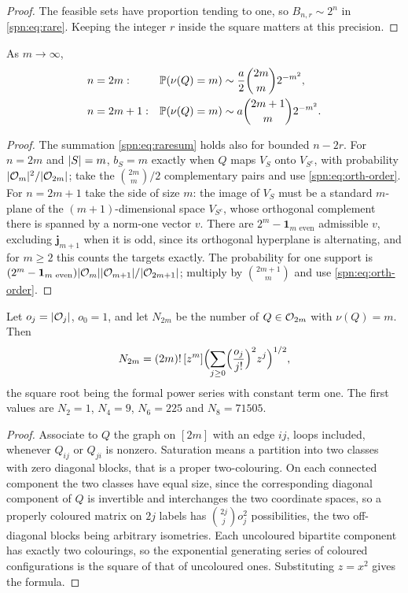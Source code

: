 \begin{proof}
The feasible sets have proportion tending to one, so $B_{n,r}\sim2^n$ in \eqref{spn:eq:rare}.
Keeping the integer $r$ inside the square matters at this precision.
\end{proof}

\begin{theorem}\label{spn:thm:saturation}
As $m\to\infty$,
\begin{align*}
 n&=2m: &\mathbb{P}(\nu(Q)=m)&\sim\frac a2\binom{2m}m2^{-m^2},\\
 n&=2m+1: &\mathbb{P}(\nu(Q)=m)&\sim a\binom{2m+1}m2^{-m^2}.
\end{align*}
\end{theorem}

\begin{proof}
The summation \eqref{spn:eq:raresum} holds also for bounded $n-2r$. For $n=2m$ and $\lvert S\rvert=m$,
$b_S=m$ exactly when $Q$ maps $V_S$ onto $V_{S^c}$, with probability
$\lvert\mathcal{O}_m\rvert^2/\lvert\mathcal{O}_{2m}\rvert$; take the $\binom{2m}m/2$ complementary pairs and use
\eqref{spn:eq:orth-order}. For $n=2m+1$ take the side of size $m$: the image of $V_S$ must be a
standard $m$-plane of the $(m+1)$-dimensional space $V_{S^c}$, whose orthogonal complement there is
spanned by a norm-one vector $v$. There are $2^m-\mathbf 1_{m\text{ even}}$ admissible $v$,
excluding $\mathbf j_{m+1}$ when it is odd, since its orthogonal hyperplane is alternating, and
for $m\ge2$ this counts the targets exactly. The probability for one support is
$(2^m-\mathbf 1_{m\text{ even}})\lvert\mathcal{O}_m\rvert\lvert\mathcal{O}_{m+1}\rvert/\lvert\mathcal{O}_{2m+1}\rvert$;
multiply by $\binom{2m+1}m$ and use \eqref{spn:eq:orth-order}.
\end{proof}

\begin{proposition}\label{spn:prop:saturated-count}
Let $o_j=\lvert\mathcal{O}_j\rvert$, $o_0=1$, and let $N_{2m}$ be the number of $Q\in\mathcal{O}_{2m}$ with
$\nu(Q)=m$. Then
\[
 N_{2m}=(2m)!\,[z^m]\Bigl(\sum_{j\ge0}\Bigl(\frac{o_j}{j!}\Bigr)^2z^j\Bigr)^{1/2},
\]
the square root being the formal power series with constant term one. The first values are
$N_2=1$, $N_4=9$, $N_6=225$ and $N_8=71505$.
\end{proposition}

\begin{proof}
Associate to $Q$ the graph on $[2m]$ with an edge $ij$, loops included, whenever $Q_{ij}$ or
$Q_{ji}$ is nonzero. Saturation means a partition into two classes with zero diagonal blocks,
that is a proper two-colouring. On each connected component the two classes have equal size,
since the corresponding diagonal component of $Q$ is invertible and interchanges the two
coordinate spaces, so a properly coloured matrix on $2j$ labels has $\binom{2j}jo_j^2$
possibilities, the two off-diagonal blocks being arbitrary isometries. Each uncoloured bipartite
component has exactly two colourings, so the exponential generating series of coloured
configurations is the square of that of uncoloured ones. Substituting $z=x^2$ gives the formula.
\end{proof}

